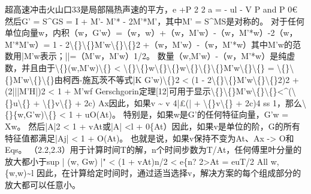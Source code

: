 \documentclass[UTF8,11pt,a4paper,openany,fontset=fandol]{ctexbook}
\begin{document}
超高速冲击火山口33是局部隔热声速的平方，e +P 2 2 a = - ul - V P and P 0€ 然后G' = S\textasciicircum{}GS = I + M'- M'* - 2M'*M'，其中M' = S\textasciicircum{}MS是对称的。 对于任何单位向量w，内积（w，G'w）=（w，w）+（w，M'w）-（w，M'*w）-2（w，M'*M'w）= 1 - 2\textbackslash\{\}\textbackslash\{\}M'w\textbackslash\{\}\textbackslash\{\}2 +（w，M'w）-（w，M'*w）其中M'w的范数用|M'w表示；||=（M'w，M'w）1/2。 数量（w,M'w）-（w，M'*w）是纯虚数，并且由于\textbackslash\{\}(w,M'w)\textbackslash\{\} < \textbackslash\{\}\textbackslash\{\}w\textbackslash\{\}\textbackslash\{\}w\textbackslash\{\}\textbackslash\{\}\textbackslash\{\}M'w\textbackslash\{\}\textbackslash\{\} = \textbackslash\{\}\textbackslash\{\}M'w\textbackslash\{\}\textbackslash\{\}由柯西-施瓦茨不等式|K G'w)\textbackslash\{\}2 < (1 - 2\textbackslash\{\}\textbackslash\{\}M'w\textbackslash\{\}\textbackslash\{\}2)2 + (2|||M'H|)2 < 1 + M'wf Gerschgorin定理[12]可用于显示\textbackslash\{\}\textbackslash\{\}M'w\textbackslash\{\}\textbackslash\{\}<\textasciicircum{}(\textbackslash\{\}u\textbackslash\{\} + \textbackslash\{\}v\textbackslash\{\} + 2c) Ax因此，如果v \textasciitilde{} v 4|£(| + \textbackslash\{\}v\textbackslash\{\} + 2c)4 ss 1，那么\textbackslash\{\}\{w,G'w)\textbackslash\{\} < 1 + uO(At)。 特别是，如果w是G'的任何特征向量，G'w = Xw。 然后|A|2 < 1 + vAt或|A| <l + 0\{At）因此，如果v是单位的阶，G的所有特征值都满足|Aj| < 1 + O(At)。 也就是说，如果v保持不变为At、Ax -> O和Eqs。 （2.2,2.3）用于计算时间T的解，n个时间步数为T/At，任何傅里叶分量的放大都小于sup | (w, Gw) |" < (1 + vAt)n/2 < e\{n? 2>At = euT/2 All w, \{w,w)\textasciitilde{}l 因此，在计算给定时间时，通过适当选择v，解决方案的每个组成部分的放大都可以任意小。
\end{document}

